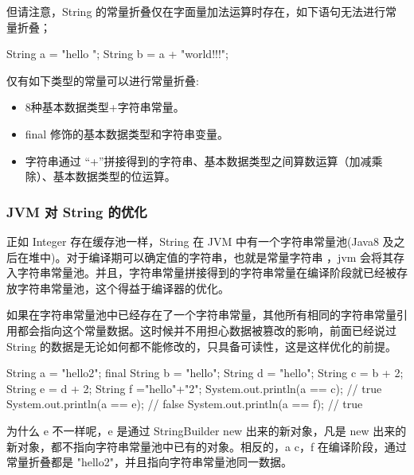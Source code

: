 但请注意，String 的常量折叠仅在字面量加法运算时存在，如下语句无法进行常量折叠；

\begin{Java}
String a = "hello ";
String b = a + "world!!!";
\end{Java}

仅有如下类型的常量可以进行常量折叠:
\begin{itemize}
    \item 8种基本数据类型+字符串常量。
    \item final 修饰的基本数据类型和字符串变量。
    \item 字符串通过 “+”拼接得到的字符串、基本数据类型之间算数运算（加减乘除）、基本数据类型的位运算。
\end{itemize}

\subsubsection{JVM 对 String 的优化}

正如 Integer 存在缓存池一样，String 在 JVM 中有一个字符串常量池(Java8 及之后在堆中)。对于编译期可以确定值的字符串，也就是常量字符串 ，jvm 会将其存入字符串常量池。并且，字符串常量拼接得到的字符串常量在编译阶段就已经被存放字符串常量池，这个得益于编译器的优化。

如果在字符串常量池中已经存在了一个字符串常量，其他所有相同的字符串常量引用都会指向这个常量数据。这时候并不用担心数据被篡改的影响，前面已经说过 String 的数据是无论如何都不能修改的，只具备可读性，这是这样优化的前提。

\begin{Java}
String a = "hello2";
final String b = "hello";
String d = "hello";
String c = b + 2;
String e = d + 2;
String f ="hello"+"2";
System.out.println(a == c); // true
System.out.println(a == e); // false
System.out.println(a == f); // true
\end{Java}

为什么 e 不一样呢，e 是通过 StringBuilder new 出来的新对象，凡是 new 出来的新对象，都不指向字符串常量池中已有的对象。相反的，a c，f 在编译阶段，通过常量折叠都是 "hello2"，并且指向字符串常量池同一数据。

\newpage